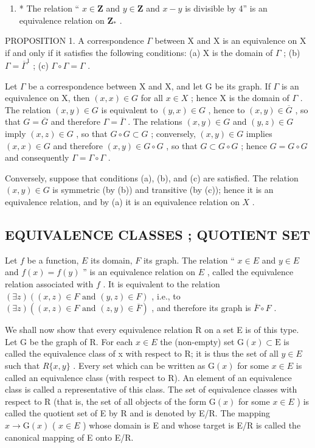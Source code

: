 \begin{enumerate}
\def\labelenumi{(\arabic{enumi})}
\setcounter{enumi}{5}
\tightlist
\item
  * The relation `` \(x \in \mathbf{Z}\) and \(y \in \mathbf{Z}\) and \(x - y\) is divisible by 4'' is an equivalence relation on \(\mathbf{Z}_{*}\) .
\end{enumerate}

PROPOSITION 1. A correspondence \(\Gamma\) between X and X is an equivalence on X if and only if it satisfies the following conditions: (a) X is the domain of \(\Gamma\) ; (b) \(\Gamma = \overline{\Gamma}^1\) ; (c) \(\Gamma \circ \Gamma = \Gamma\) .

Let \(\Gamma\) be a correspondence between X and X, and let G be its graph. If \(\Gamma\) is an equivalence on X, then \((x, x) \in G\) for all \(x \in X\) ; hence X is the domain of \(\Gamma\) . The relation \((x, y) \in G\) is equivalent to \((y, x) \in G\) , hence to \((x, y) \in \overline{G}\) , so that \(G = \overline{G}\) and therefore \(\Gamma = \overline{\Gamma}\) . The relations \((x, y) \in G\) and \((y, z) \in G\) imply \((x, z) \in G\) , so that \(G \circ G \subset G\) ; conversely, \((x, y) \in G\) implies \((x, x) \in G\) and therefore \((x, y) \in G \circ G\) , so that \(G \subset G \circ G\) ; hence \(G = G \circ G\) and consequently \(\Gamma = \Gamma \circ \Gamma\) .

Conversely, suppose that conditions (a), (b), and (c) are satisfied. The relation \((x, y) \in G\) is symmetric (by (b)) and transitive (by (c)); hence it is an equivalence relation, and by (a) it is an equivalence relation on \(X\) .

\subsection{EQUIVALENCE CLASSES ; QUOTIENT SET}

Let \(f\) be a function, \(E\) its domain, \(F\) its graph. The relation `` \(x \in E\) and \(y \in E\) and \(f(x) = f(y)\) '' is an equivalence relation on \(E\) , called the equivalence relation associated with \(f\) . It is equivalent to the relation \((\exists z)((x, z) \in F \text{ and } (y, z) \in F)\) , i.e., to \((\exists z)((x, z) \in F \text{ and } (z, y) \in \overline{F})\) , and therefore its graph is \(\overline{F} \circ F\) .

We shall now show that every equivalence relation R on a set E is of this type. Let G be the graph of R. For each \(x \in E\) the (non-empty) set \(\mathrm{G}(x) \subset \mathrm{E}\) is called the equivalence class of x with respect to R; it is thus the set of all \(y \in E\) such that \(R\{x, y\}\) . Every set which can be written as \(\mathrm{G}(x)\) for some \(x \in E\) is called an equivalence class (with respect to R). An element of an equivalence class is called a representative of this class. The set of equivalence classes with respect to R (that is, the set of all objects of the form \(\mathrm{G}(x)\) for some \(x \in E\) ) is called the quotient set of E by R and is denoted by E/R. The mapping \(x \to \mathrm{G}(x)\) ( \(x \in E\) ) whose domain is E and whose target is E/R is called the canonical mapping of E onto E/R.

